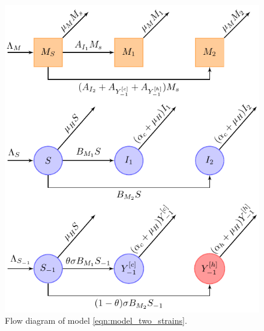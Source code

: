 \begin{figure}[h]
	\centering
	\includegraphics[width=\textwidth]{disiase_flow.pdf}
	\caption{Flow diagram of model \eqref{eqn:model_two_strains}.}
	\label{fig:disiaseflow}
\end{figure}
%

